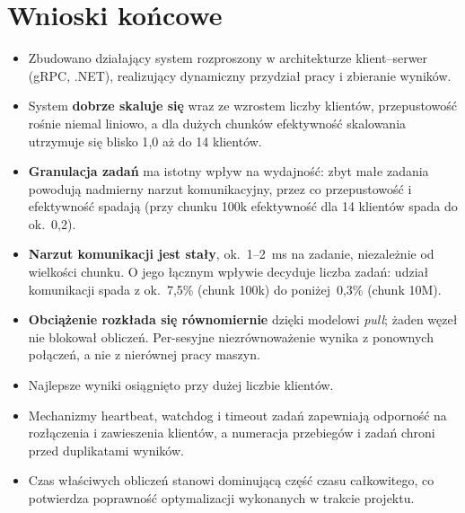 \documentclass[11pt,a4paper]{article}
\begin{document}
\section{Wnioski końcowe}
\begin{itemize}
  \item Zbudowano działający system rozproszony w architekturze klient--serwer (gRPC, .NET),
        realizujący dynamiczny przydział pracy i zbieranie wyników.
  \item System \textbf{dobrze skaluje się} wraz ze wzrostem liczby klientów, przepustowość
        rośnie niemal liniowo, a dla dużych chunków efektywność skalowania utrzymuje się blisko
        1{,}0 aż do 14 klientów.
  \item \textbf{Granulacja zadań} ma istotny wpływ na wydajność: zbyt małe zadania powodują
        nadmierny narzut komunikacyjny, przez co przepustowość i efektywność spadają (przy chunku
        100k efektywność dla 14 klientów spada do ok.~0{,}2).
  \item \textbf{Narzut komunikacji jest stały}, ok.~1--2~ms na zadanie, niezależnie od wielkości
        chunku. O jego łącznym wpływie decyduje liczba zadań: udział komunikacji spada z ok.~7{,}5\%
        (chunk 100k) do poniżej~0{,}3\% (chunk 10M).
  \item \textbf{Obciążenie rozkłada się równomiernie} dzięki modelowi \emph{pull}; żaden węzeł nie
        blokował obliczeń. Per-sesyjne niezrównoważenie wynika z ponownych połączeń, a nie z
        nierównej pracy maszyn.
  \item Najlepsze wyniki osiągnięto przy dużej liczbie klientów.
  \item Mechanizmy heartbeat, watchdog i timeout zadań zapewniają odporność na rozłączenia i
        zawieszenia klientów, a numeracja przebiegów i zadań chroni przed duplikatami wyników.
  \item Czas właściwych obliczeń stanowi dominującą część czasu całkowitego, co potwierdza
        poprawność optymalizacji wykonanych w trakcie projektu.
\end{itemize}
\end{document}
